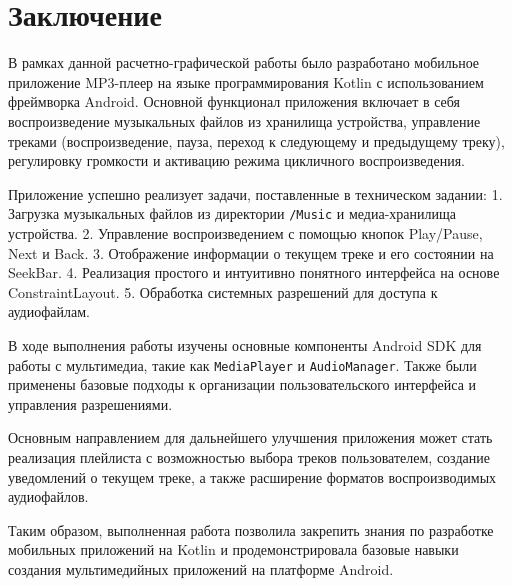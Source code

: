\chapter*{Заключение}

В рамках данной расчетно-графической работы было разработано мобильное приложение MP3-плеер на языке программирования Kotlin с использованием фреймворка Android. Основной функционал приложения включает в себя воспроизведение музыкальных файлов из хранилища устройства, управление треками (воспроизведение, пауза, переход к следующему и предыдущему треку), регулировку громкости и активацию режима цикличного воспроизведения.

Приложение успешно реализует задачи, поставленные в техническом задании:  
1. Загрузка музыкальных файлов из директории \texttt{/Music} и медиа-хранилища устройства.  
2. Управление воспроизведением с помощью кнопок Play/Pause, Next и Back.  
3. Отображение информации о текущем треке и его состоянии на SeekBar.  
4. Реализация простого и интуитивно понятного интерфейса на основе ConstraintLayout.  
5. Обработка системных разрешений для доступа к аудиофайлам.  

В ходе выполнения работы изучены основные компоненты Android SDK для работы с мультимедиа, такие как \texttt{MediaPlayer} и \texttt{AudioManager}. Также были применены базовые подходы к организации пользовательского интерфейса и управления разрешениями.

Основным направлением для дальнейшего улучшения приложения может стать реализация плейлиста с возможностью выбора треков пользователем, создание уведомлений о текущем треке, а также расширение форматов воспроизводимых аудиофайлов.

Таким образом, выполненная работа позволила закрепить знания по разработке мобильных приложений на Kotlin и продемонстрировала базовые навыки создания мультимедийных приложений на платформе Android.

\endinput
